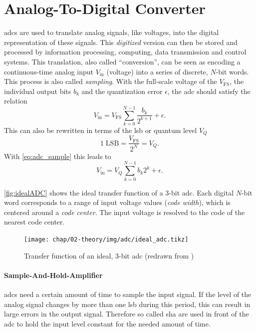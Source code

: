 \newpage
\section{Analog-To-Digital Converter}
\Glspl{adc} are used to translate analog signals, like voltages, into the digital representation of these signals.
This \textit{digitized} version can then be stored and processed by information processing, computing, data transmission and control systems. 
This translation, also called ``conversion'', can be seen as encoding a continuous-time analog input $V_\text{in}$ (voltage) into a series of discrete, $N$-bit words. %
This process is also called \textit{sampling}. 
With the full-scale voltage of the $V_{\text{FS}}$, the individual output bits $b_k$ and the quantization error $\epsilon$, the \gls{adc} should satisfy the relation
\begin{equation} \label{eq:adc_sample}
	V_{\text{in}} = V_{\text{FS}} \sum_{k = 0}^{N-1} \frac{b_k}{2^{k+1}} + \epsilon.
\end{equation}
This can also be rewritten in terms of the \gls{lsb} or quantum level $V_Q$
\begin{equation}
	1 \; \text{LSB} = \frac{V_\text{FS}}{2^N} = V_Q.
\end{equation}
With \autoref{eq:adc_sample} this leads to 
\begin{equation}
	V_\text{in} = V_Q \sum_{k = 0}^{N-1} b_k 2^{k}  + \epsilon.
\end{equation}

\autoref{fig:idealADC} shows the ideal transfer function of a 3-bit \gls{adc}. 
Each digital $N$-bit word corresponds to a range of input voltage values (\textit{code width}), which is centered around a \textit{code center}.
The input voltage is resolved to the code of the nearest code center.
\begin{figure}[H]
	\centering
	\texttt{[image: chap/02-theory/img/adc/ideal\_adc.tikz]}
	\caption[Transfer function of ideal, 3-bit ADC]{Transfer function of an ideal, 3-bit \gls{adc} (redrawn from \cite{Lundberg})}
	\label{fig:idealADC}
\end{figure}


\paragraph{Sample-And-Hold-Amplifier}
\Glspl{adc} need a certain amount of time to sample the input signal.
If the level of the analog signal changes by more than one \gls{lsb} during this period, this can result in large errors in the output signal.
Therefore so called \gls{sha} are used in front of the \gls{adc} to hold the input level constant for the needed amount of time.

